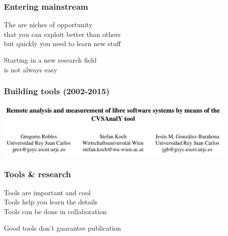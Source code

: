 \documentclass[17pt,aspectratio=169,hyperref=pdfusetitle]{beamer}
\begin{document}
\begin{frame}[fragile]
  \frametitle{Entering mainstream}

  The are niches of opportunity \\
  that you can exploit better than others \\
  but quickly you need to learn new stuff \\
  
  \begin{center}
    Starting in a new research field \\
    is not always easy \\
  \end{center}  
  
\end{frame}


\begin{frame}[fragile]
  \frametitle{Building tools (2002-2015)}

  \begin{center}
  \includegraphics[width=12cm]{figs/cvsanaly}
  \end{center}  
  
\end{frame}

\begin{frame}[fragile]
  \frametitle{Tools \& research}

  Tools are important and cool \\
  Tools help you learn the details \\
  Tools can be done in collaboration \\
  
  \begin{center}
      Good tools don't guarantee publication
  \end{center}  
  
\end{frame}
\end{document}
